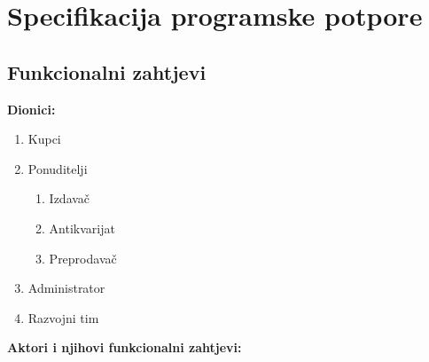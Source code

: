 \documentclass[12pt]{report}
\begin{document}
\setcounter{chapter}{2}
\chapter{Specifikacija programske potpore}

\section{Funkcionalni zahtjevi}

\noindent \textbf{Dionici:}

\begin{enumerate}
	
	\item Kupci 
	\item Ponuditelji
	\begin{enumerate}
		\item Izdavač
		\item Antikvarijat
		\item Preprodavač
	\end{enumerate}	
	\item Administrator		
	\item Razvojni tim
	
\end{enumerate}

\noindent \textbf{Aktori i njihovi funkcionalni zahtjevi:}
\end{document}
